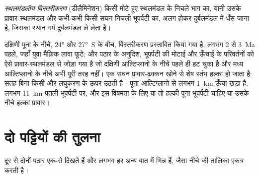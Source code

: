 \begin{definition}\label{def:b2:himalaya-andes:delamination}
\emph{स्थलमंडलीय विस्तरीकरण} (डीलैमिनेशन) किसी मोटे हुए स्थलमंडल के निचले भाग का,
यानी उसके प्रावार-स्थलमंडल और कभी-कभी किसी सघन निचली भूपर्पटी का, अलग होकर
दुर्बलमंडल में धँस जाना है, जिसका स्थान गर्म दुर्बलमंडल ले लेता है।
\end{definition}

दक्षिणी पूना के नीचे, \ang{24} और \ang{27}~S के बीच, विस्तरीकरण प्रस्तावित किया गया है,
लगभग 2 से \qty{3}{Ma} पहले, जहाँ युवा मैफ़िक लावा फूटे; और पठार के अनुदिश, भूपर्पटी की
मोटाई और ऊँचाई के परिवर्तनों को ऐसे प्रावार-स्थलमंडल से जोड़ा गया है जो दक्षिणी आल्टिप्लानो के नीचे
पहले ही हट चुका है और मध्य आल्टिप्लानो के नीचे अभी पूरी तरह नहीं। एक
सघन प्रावार-ढक्कन खोने से शेष स्तंभ हल्का हो जाता है: सतह बिना किसी और
लघुकरण के ऊपर उठती है। पूना आल्टिप्लानो से लगभग \qty{1}{km} ऊँचा खड़ा है, लगभग
\qty{11}{km} पतली भूपर्पटी पर, और इस विषमता के लिए या तो हल्की पूना भूपर्पटी चाहिए या उसके
नीचे हल्का प्रावार।

\section{दो पट्टियों की तुलना}\label{sec:b2:himalaya-andes:compared}

दूर से दोनों पठार एक-से दिखते हैं और लगभग हर अन्य बात में भिन्न हैं, जैसा नीचे की तालिका
एकत्र करती है।

